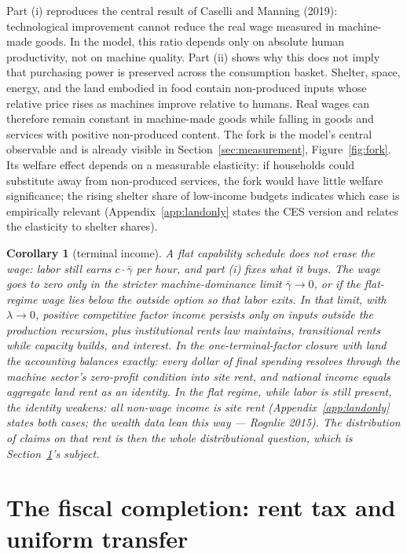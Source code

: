 \documentclass[12pt]{article}
\theoremstyle{plain}
\newtheorem*{corollary}{Corollary}
\begin{document}
Part (i) reproduces the central result of Caselli and Manning (2019): technological improvement cannot reduce the real wage measured in machine-made goods. In the model, this ratio depends only on absolute human productivity, not on machine quality. Part (ii) shows why this does not imply that purchasing power is preserved across the consumption basket. Shelter, space, energy, and the land embodied in food contain non-produced inputs whose relative price rises as machines improve relative to humans. Real wages can therefore remain constant in machine-made goods while falling in goods and services with positive non-produced content. The fork is the model's central observable and is already visible in Section~\ref{sec:measurement}, Figure~\ref{fig:fork}. Its welfare effect depends on a measurable elasticity: if households could substitute away from non-produced services, the fork would have little welfare significance; the rising shelter share of low-income budgets indicates which case is empirically relevant (Appendix~\ref{app:landonly} states the CES version and relates the elasticity to shelter shares).

\begin{corollary}[terminal income]
A flat capability schedule does not erase the wage: labor still earns $c\cdot\bar{\gamma}$ per hour, and part (i) fixes what it buys. The wage goes to zero only in the stricter machine-dominance limit $\bar{\gamma}\to0$, or if the flat-regime wage lies below the outside option so that labor exits. In that limit, with $\lambda \to 0$, positive competitive factor income persists only on inputs outside the production recursion, plus institutional rents law maintains, transitional rents while capacity builds, and interest. In the one-terminal-factor closure with land the accounting balances exactly: every dollar of final spending resolves through the machine sector's zero-profit condition into site rent, and national income equals aggregate land rent as an identity. In the flat regime, while labor is still present, the identity weakens: all non-wage income is site rent (Appendix~\ref{app:landonly} states both cases; the wealth data lean this way --- Rognlie 2015). The distribution of claims on that rent is then the whole distributional question, which is Section~\ref{sec:fiscal}'s subject.
\end{corollary}

\section{The fiscal completion: rent tax and uniform transfer}\label{sec:fiscal}
\end{document}
